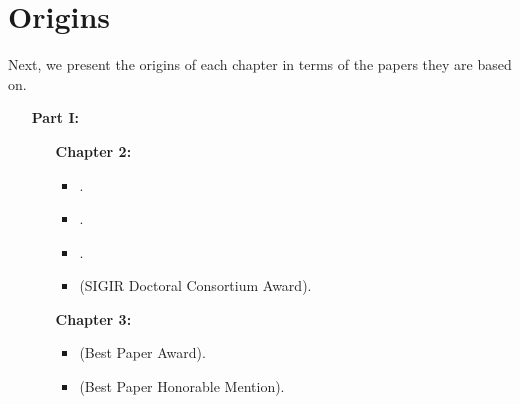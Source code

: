 \section{Origins}
Next, we present the origins of each chapter in terms of the papers they are based on.
\begin{itemize}
    \setlength{\itemindent}{10pt}
    \item[\textbf{Part I:}] \emph{}
%  
        \begin{itemize}
            \setlength{\itemindent}{15pt}
            \item[\textbf{Chapter 2:}] \emph{}
            \begin{itemize}[label=\textbullet] 
                \item {}.
                \item {}.
                \item {}.
                \item {} (SIGIR Doctoral Consortium Award).
            \end{itemize}
    
            \item[\textbf{Chapter 3:}] \emph{}
            \begin{itemize}[label=\textbullet] 
                \item {} (Best Paper Award).
                \item {} (Best Paper Honorable Mention).
            \end{itemize}
        \end{itemize}
%  
\end{itemize}
%
